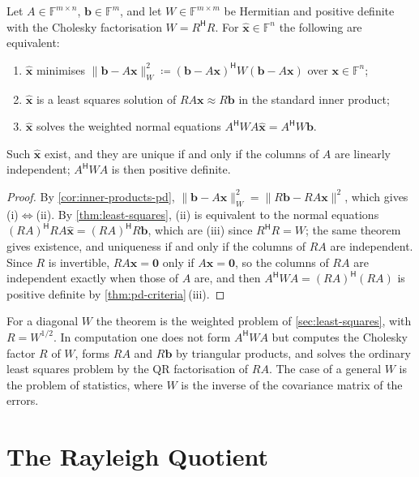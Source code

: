 \begin{theorem}
\label{thm:weighted-ls}
Let $A\in\mathbb F^{m\times n}$, $\mathbf b\in\mathbb F^m$, and let $W\in\mathbb F^{m\times m}$ be Hermitian and positive definite with the Cholesky factorisation $W=R^{\mathsf H}R$. For $\hat{\mathbf x}\in\mathbb F^n$ the following are equivalent:
\begin{enumerate}
\item $\hat{\mathbf x}$ minimises $\|\mathbf b-A\mathbf x\|_W^2\coloneqq(\mathbf b-A\mathbf x)^{\mathsf H}W(\mathbf b-A\mathbf x)$ over $\mathbf x\in\mathbb F^n$;
\item $\hat{\mathbf x}$ is a least squares solution of $RA\mathbf x\approx R\mathbf b$ in the standard inner product;
\item $\hat{\mathbf x}$ solves the weighted normal equations $A^{\mathsf H}WA\hat{\mathbf x}=A^{\mathsf H}W\mathbf b$.
\end{enumerate}
Such $\hat{\mathbf x}$ exist, and they are unique if and only if the columns of $A$ are linearly independent; $A^{\mathsf H}WA$ is then positive definite.
\end{theorem}

\begin{proof}
By \cref{cor:inner-products-pd}, $\|\mathbf b-A\mathbf x\|_W^2=\|R\mathbf b-RA\mathbf x\|^2$, which gives (i)$\Leftrightarrow$(ii). By \cref{thm:least-squares}, (ii) is equivalent to the normal equations $(RA)^{\mathsf H}RA\hat{\mathbf x}=(RA)^{\mathsf H}R\mathbf b$, which are (iii) since $R^{\mathsf H}R=W$; the same theorem gives existence, and uniqueness if and only if the columns of $RA$ are independent. Since $R$ is invertible, $RA\mathbf x=\mathbf 0$ only if $A\mathbf x=\mathbf 0$, so the columns of $RA$ are independent exactly when those of $A$ are, and then $A^{\mathsf H}WA=(RA)^{\mathsf H}(RA)$ is positive definite by \cref{thm:pd-criteria}\,(iii).
\end{proof}

For a diagonal $W$ the theorem is the weighted problem of \cref{sec:least-squares}, with $R=W^{1/2}$. In computation one does not form $A^{\mathsf H}WA$ but computes the Cholesky factor $R$ of $W$, forms $RA$ and $R\mathbf b$ by triangular products, and solves the ordinary least squares problem by the QR factorisation of $RA$. The case of a general $W$ is the  problem of statistics, where $W$ is the inverse of the covariance matrix of the errors.

\section{The Rayleigh Quotient}
\label{sec:rayleigh}

